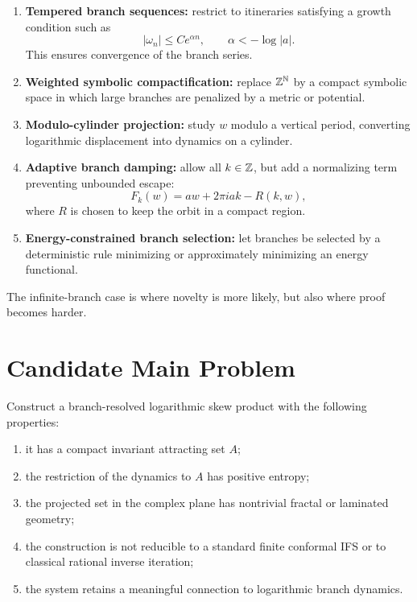 	\begin{enumerate}
		\item \textbf{Tempered branch sequences:}
		restrict to itineraries satisfying a growth condition such as
		\[
		|\omega_n|\leq C e^{\alpha n},
		\qquad
		\alpha < -\log |a|.
		\]
		This ensures convergence of the branch series.
		
		\item \textbf{Weighted symbolic compactification:}
		replace \(\mathbb{Z}^{\mathbb{N}}\) by a compact symbolic space in which large branches are penalized by a metric or potential.
		
		\item \textbf{Modulo-cylinder projection:}
		study \(w\) modulo a vertical period, converting logarithmic displacement into dynamics on a cylinder.
		
		\item \textbf{Adaptive branch damping:}
		allow all \(k\in\mathbb{Z}\), but add a normalizing term preventing unbounded escape:
		\[
		F_k(w)=a w + 2\pi i a k - R(k,w),
		\]
		where \(R\) is chosen to keep the orbit in a compact region.
		
		\item \textbf{Energy-constrained branch selection:}
		let branches be selected by a deterministic rule minimizing or approximately minimizing an energy functional.
	\end{enumerate}
	
	The infinite-branch case is where novelty is more likely, but also where proof becomes harder.
	
	\section{Candidate Main Problem}
	
	\begin{problem}
		Construct a branch-resolved logarithmic skew product with the following properties:
		\begin{enumerate}
			\item it has a compact invariant attracting set \(A\);
			\item the restriction of the dynamics to \(A\) has positive entropy;
			\item the projected set in the complex plane has nontrivial fractal or laminated geometry;
			\item the construction is not reducible to a standard finite conformal IFS or to classical rational inverse iteration;
			\item the system retains a meaningful connection to logarithmic branch dynamics.
		\end{enumerate}
	\end{problem}
	
